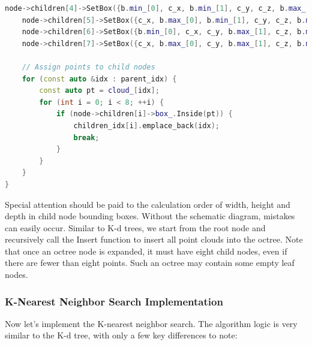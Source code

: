 \begin{lstlisting}[language=c++,caption=src/ch5/octo\_tree.cc]
	node->children[4]->SetBox({b.min_[0], c_x, b.min_[1], c_y, c_z, b.max_[2]});
	node->children[5]->SetBox({c_x, b.max_[0], b.min_[1], c_y, c_z, b.max_[2]});
	node->children[6]->SetBox({b.min_[0], c_x, c_y, b.max_[1], c_z, b.max_[2]});
	node->children[7]->SetBox({c_x, b.max_[0], c_y, b.max_[1], c_z, b.max_[2]});
	
	// Assign points to child nodes
	for (const auto &idx : parent_idx) {
		const auto pt = cloud_[idx];
		for (int i = 0; i < 8; ++i) {
			if (node->children[i]->box_.Inside(pt)) {
				children_idx[i].emplace_back(idx);
				break;
			}
		}
	}
}
\end{lstlisting}

Special attention should be paid to the calculation order of width, height and depth in child node bounding boxes. Without the schematic diagram, mistakes can easily occur. Similar to K-d trees, we start from the root node and recursively call the Insert function to insert all point clouds into the octree. Note that once an octree node is expanded, it must have eight child nodes, even if there are fewer than eight points. Such an octree may contain some empty leaf nodes.

\subsubsection{K-Nearest Neighbor Search Implementation}
Now let's implement the K-nearest neighbor search. The algorithm logic is very similar to the K-d tree, with only a few key differences to note:

